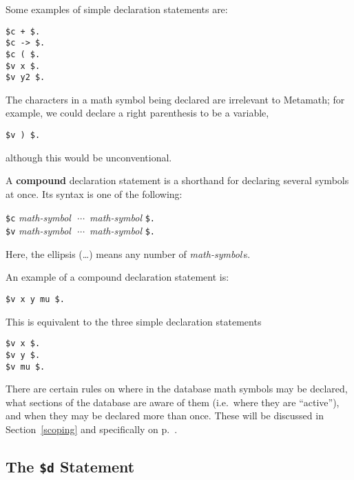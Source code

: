Some examples of simple declaration statements are:
\begin{center}
  \texttt{\$c + \$.}\\
  \texttt{\$c -> \$.}\\
  \texttt{\$c ( \$.}\\
  \texttt{\$v x \$.}\\
  \texttt{\$v y2 \$.}
\end{center}

The characters in a math symbol being declared are
irrelevant to Meta\-math; for example, we could declare a right parenthesis to
be a variable,
\begin{center}
  \texttt{\$v ) \$.}\\
\end{center}
although this would be unconventional.

A {\bf compound} declaration statement is a
shorthand for declaring several symbols at once.  Its syntax is one of the
following:
\begin{center}
  \texttt{\$c} {\em math-symbol}\ \,$\cdots$\ {\em math-symbol} \texttt{\$.}\\
  \texttt{\$v} {\em math-symbol}\ \,$\cdots$\ {\em math-symbol} \texttt{\$.}
\end{center}
Here, the ellipsis (\ldots) means any number of {\em math-symbol}\,s.

An example of a compound declaration statement is:
\begin{center}
  \texttt{\$v x y mu \$.}\\
\end{center}
This is equivalent to the three simple declaration statements
\begin{center}
  \texttt{\$v x \$.}\\
  \texttt{\$v y \$.}\\
  \texttt{\$v mu \$.}\\
\end{center}

There are certain rules on where in the database math symbols may be declared,
what sections of the database are aware of them (i.e.\ where they are
``active''), and when they may be declared more than once.  These will be
discussed in Section~\ref{scoping} and specifically on
p.~\pageref{redeclaration}.

\subsection{The \texttt{\$d} Statement}\label{dollard}

